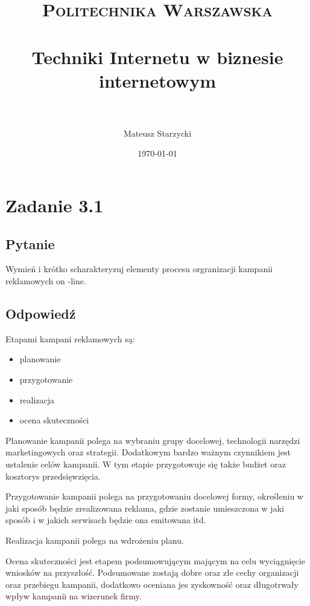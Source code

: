 \documentclass[paper=a4, fontsize=11pt]{scrartcl} %
\title{ 
    \normalfont \normalsize 
    \textsc{Politechnika Warszawska} \\ [25pt] %
    \horrule{0.5pt} \\[0.4cm] %
    \huge Techniki Internetu w biznesie internetowym\\ %
    \horrule{2pt} \\[0.5cm] %
}
\author{Mateusz Starzycki} %
\date{\normalsize\today} %
\numberwithin{equation}{section} %
\numberwithin{figure}{section} %
\numberwithin{table}{section} %
\begin{document}
\maketitle %


\newpage

\section{Zadanie 3.1}

\subsection {Pytanie}

Wymień i krótko scharakteryzuj elementy procesu orgranizacji kampanii reklamowych on -line.

\subsection {Odpowiedź}

Etapami kampani reklamowych są:

\begin {itemize}
  \item planowanie
  \item przygotowanie
  \item realizacja
  \item ocena skuteczności
\end {itemize}

Planowanie kampanii polega na wybraniu grupy docelowej, technologii narzędzi marketingowych oraz strategii.
Dodatkowym bardzo ważnym czynnikiem jest ustalenie celów kampanii. W tym etapie przygotowuje się także budżet
oraz kosztorys przedsięwzięcia.

Przygotowanie kampanii polega na przygotowaniu docelowej formy, określeniu w jaki sposób będzie zrealizowana
reklama, gdzie zostanie umieszczona w jaki sposób i w jakich serwisach będzie ona emitowana itd.

Realizacja kampanii polega na wdrożeniu planu.

Ocena skuteczności jest etapem podsumowującym mającym na celu wyciągnięcie wniosków na przyszłość.
Podsumowane zostają dobre oraz złe cechy organizacji oraz przebiegu kampanii, dodatkowo oceniana jes zyskowność
oraz długotrwały wpływ kampanii na wizerunek firmy.
\end{document}
